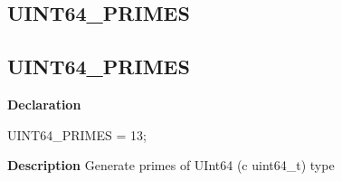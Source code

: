 \documentclass{report}
\newif\ifpdf
\begin{document}
\subsection*{\large{\textbf{UINT64{\_}PRIMES}}\normalsize\hspace{1ex}\hrulefill}
\else
\subsection*{UINT64{\_}PRIMES}
\fi
\label{primesieve-UINT64_PRIMES}
\begin{list}{}{
\setlength{\itemindent}{0cm}
\setlength{\listparindent}{0cm}
\setlength{\leftmargin}{\evensidemargin}
\addtolength{\leftmargin}{\tmplength}
\settowidth{\labelsep}{X}
\addtolength{\leftmargin}{\labelsep}
\setlength{\labelwidth}{\tmplength}
}
\item[\textbf{Declaration}\hfill]
\ifpdf
\begin{flushleft}
\fi
\begin{ttfamily}
UINT64{\_}PRIMES = 13;\end{ttfamily}

\ifpdf
\end{flushleft}
\fi

\par
\item[\textbf{Description}]
Generate primes of UInt64 (c uint64{\_}t) type

\end{list}
\end{document}
